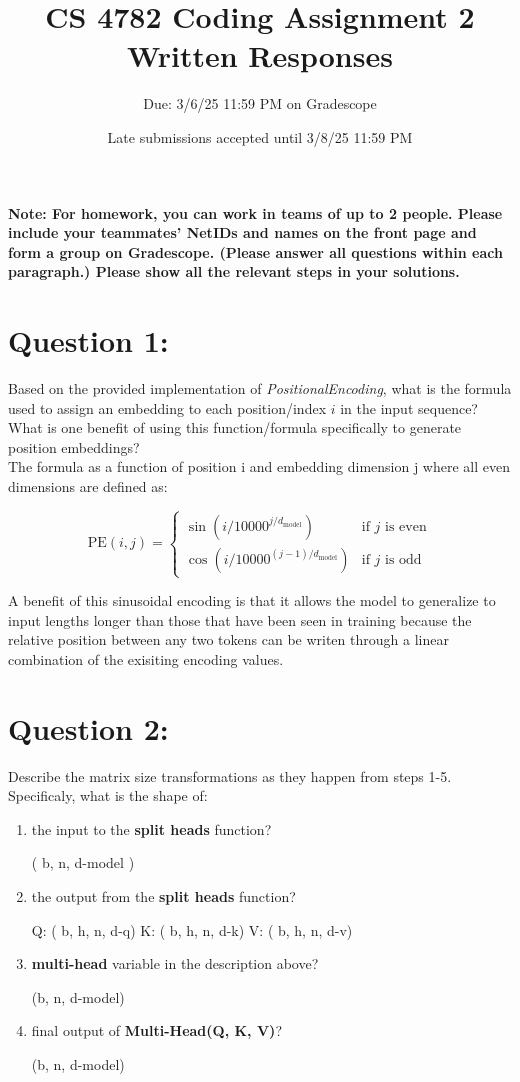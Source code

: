 \documentclass{article}
\title{CS 4782 Coding Assignment 2 Written Responses\vspace{-10pt}}
\author{Due: 3/6/25 11:59 PM on Gradescope}
\date{Late submissions accepted until 3/8/25 11:59 PM}
\begin{document}
    \maketitle
    \textbf{Note: For homework, you can work in teams of up to 2 people. Please include your teammates’ NetIDs and names on the front page and form a group on Gradescope. (Please answer all questions within each paragraph.) Please show all the relevant steps in your solutions. }
\maketitle
\section*{Question 1:}

Based on the provided implementation of \textit{PositionalEncoding}, what is the formula used to assign an embedding to each position/index $i$ in the input sequence? What is one benefit of using this function/formula specifically to generate position embeddings? \\ 


The formula as a function of position i and embedding dimension j where all even dimensions are defined as:

\[
\text{PE}(i, j) = \begin{cases} \sin\!\left(i / 10000^{j/d_{\text{model}}}\right) & \text{if } j \text{ is even} \\ \cos\!\left(i / 10000^{(j-1)/d_{\text{model}}}\right) & \text{if } j \text{ is odd} \end{cases}
\] 

A benefit of this sinusoidal encoding is that it allows the model to generalize to input lengths longer than those that have been seen in training because the relative position between any two tokens can be writen through a linear combination of the exisiting encoding values. 

\section*{Question 2:}

Describe the matrix size transformations as they happen from steps 1-5. Specificaly, what is the shape of: 
\begin{enumerate}
    \item the input to the \textbf{split heads} function? 

    ( b, n, d-model )

    \item the output from the \textbf{split heads} function?
    
    Q: ( b, h, n, d-q)
    K: ( b, h, n, d-k)
    V: ( b, h, n, d-v)

    \item \textbf{multi-head} variable in the description above?

    (b, n, d-model)

    \item final output of \textbf{Multi-Head(Q, K, V)}?

    (b, n, d-model)

\end{enumerate}
\end{document}
